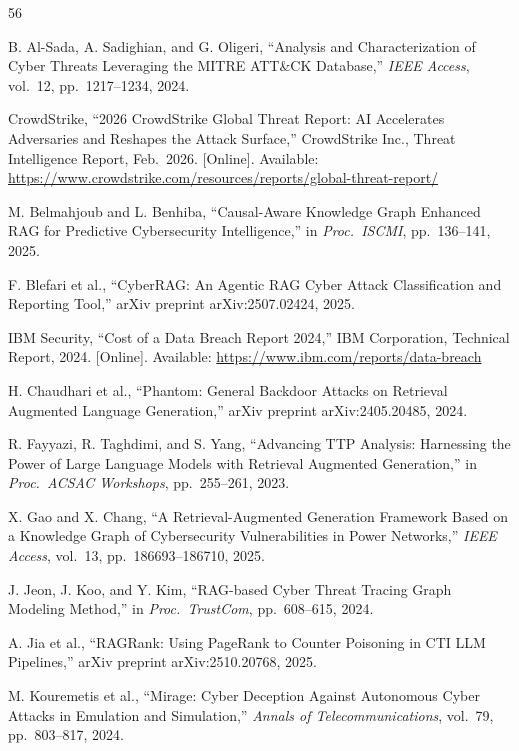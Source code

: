 \begin{thebibliography}{56}

 B. Al-Sada, A. Sadighian, and G. Oligeri, ``Analysis and Characterization of Cyber Threats Leveraging the MITRE ATT\&CK Database,'' \emph{IEEE Access}, vol.~12, pp.~1217--1234, 2024.

 CrowdStrike, ``2026 CrowdStrike Global Threat Report: AI Accelerates Adversaries and Reshapes the Attack Surface,'' CrowdStrike Inc., Threat Intelligence Report, Feb.\ 2026. [Online]. Available: \url{https://www.crowdstrike.com/resources/reports/global-threat-report/}

 M. Belmahjoub and L. Benhiba, ``Causal-Aware Knowledge Graph Enhanced RAG for Predictive Cybersecurity Intelligence,'' in \emph{Proc.\ ISCMI}, pp.~136--141, 2025.

 F. Blefari et al., ``CyberRAG: An Agentic RAG Cyber Attack Classification and Reporting Tool,'' arXiv preprint arXiv:2507.02424, 2025.

 IBM Security, ``Cost of a Data Breach Report 2024,'' IBM Corporation, Technical Report, 2024. [Online]. Available: \url{https://www.ibm.com/reports/data-breach}

 H. Chaudhari et al., ``Phantom: General Backdoor Attacks on Retrieval Augmented Language Generation,'' arXiv preprint arXiv:2405.20485, 2024.

 R. Fayyazi, R. Taghdimi, and S. Yang, ``Advancing TTP Analysis: Harnessing the Power of Large Language Models with Retrieval Augmented Generation,'' in \emph{Proc.\ ACSAC Workshops}, pp.~255--261, 2023.

 X. Gao and X. Chang, ``A Retrieval-Augmented Generation Framework Based on a Knowledge Graph of Cybersecurity Vulnerabilities in Power Networks,'' \emph{IEEE Access}, vol.~13, pp.~186693--186710, 2025.

 J. Jeon, J. Koo, and Y. Kim, ``RAG-based Cyber Threat Tracing Graph Modeling Method,'' in \emph{Proc.\ TrustCom}, pp.~608--615, 2024.

 A. Jia et al., ``RAGRank: Using PageRank to Counter Poisoning in CTI LLM Pipelines,'' arXiv preprint arXiv:2510.20768, 2025.

 M. Kouremetis et al., ``Mirage: Cyber Deception Against Autonomous Cyber Attacks in Emulation and Simulation,'' \emph{Annals of Telecommunications}, vol.~79, pp.~803--817, 2024.


\end{thebibliography}
